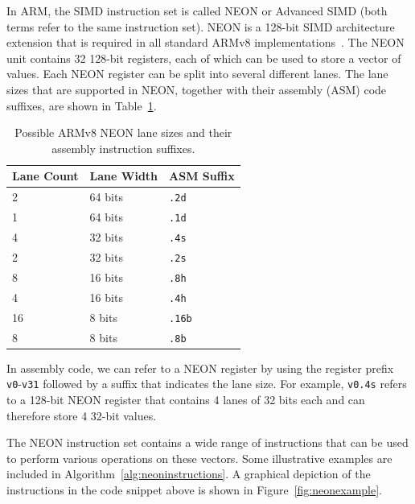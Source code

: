 \documentclass[11pt,a4paper]{report}
\theoremstyle{definition}
\begin{document}
In ARM, the SIMD instruction set is called NEON or Advanced SIMD (both terms refer to the same instruction set). NEON is a 128-bit SIMD architecture extension that is required in all standard ARMv8 implementations~\cite{ARMv8A-ProgrammersGuide}. The NEON unit contains 32 128-bit registers, each of which can be used to store a vector of values. Each NEON register can be split into several different lanes. The lane sizes that are supported in NEON, together with their assembly (ASM) code suffixes, are shown in Table~\ref{tab:neonlanes}.

\begin{table}
  \centering
  \caption{Possible ARMv8 NEON lane sizes and their assembly instruction suffixes.}
  \begin{tabular}{lll}
    \toprule
    \textbf{Lane Count} & \textbf{Lane Width} & \textbf{ASM Suffix} \\
    \midrule
    2                   & 64 bits             & \texttt{.2d}        \\
    1                   & 64 bits             & \texttt{.1d}        \\
    4                   & 32 bits             & \texttt{.4s}        \\
    2                   & 32 bits             & \texttt{.2s}        \\
    8                   & 16 bits             & \texttt{.8h}        \\
    4                   & 16 bits             & \texttt{.4h}        \\
    16                  & 8 bits              & \texttt{.16b}       \\
    8                   & 8 bits              & \texttt{.8b}        \\
    \bottomrule
  \end{tabular}
  \label{tab:neonlanes}
\end{table}

In assembly code, we can refer to a NEON register by using the register prefix \texttt{v0}-\texttt{v31} followed by a suffix that indicates the lane size. For example, \texttt{v0.4s} refers to a 128-bit NEON register that contains 4 lanes of 32 bits each and can therefore store 4 32-bit values.

The NEON instruction set contains a wide range of instructions that can be used to perform various operations on these vectors. Some illustrative examples are included in Algorithm~\ref{alg:neoninstructions}. A graphical depiction of the instructions in the code snippet above is shown in Figure~\ref{fig:neonexample}.
\end{document}
